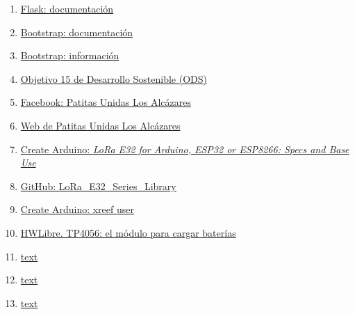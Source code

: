 \documentclass[12pt]{article}
\begin{document}
\begin{enumerate}
						
			\item 
			\label{bib: flask doc}
			\href{https://flask.palletsprojects.com/en/2.0.x/}{Flask: documentación}
			
			
			\item 
			\label{bib: bootstrap doc}
			\href{https://getbootstrap.com/docs/5.0/getting-started/introduction/}{Bootstrap: documentación}
			
			
			\item 
			\label{bib: bootstrap info}
			\href{https://rockcontent.com/es/blog/bootstrap/}{Bootstrap: información}
			
			
			\item 
			\label{bib: ods}
			\href{https://www.un.org/sustainabledevelopment/es/biodiversity/}{Objetivo 15 de Desarrollo Sostenible (ODS)}

			\item 
			\label{bib: fb patitas}
			\href{https://www.facebook.com/patitasunidaslosalcazares/}{Facebook: Patitas Unidas Los Alcázares}

			\item 
			\label{bib: web patitas}
			\href{https://patitasunidas.org/}{Web de Patitas Unidas Los Alcázares}

			\item 
			\label{bib: xreef proyect}
			\href{https://create.arduino.cc/projecthub/xreef/lora-e32-for-arduino-esp32-or-esp8266-specs-and-base-use-804d25}{Create Arduino: \textit{LoRa E32 for Arduino, ESP32 or ESP8266: Specs and Base Use}}		

			\item 
			\label{bib: xreef library}
			\href{https://github.com/xreef/LoRa_E32_Series_Library}{GitHub: LoRa\_E32\_Series\_Library}	

			\item 
			\label{bib: xreef user}
			\href{https://create.arduino.cc/projecthub/xreef}{Create Arduino: xreef user}	

			\item 
			\label{bib: hwlibre TP4056}
			\href{https://www.hwlibre.com/tp4056/}{HWLibre. TP4056: el módulo para cargar baterías}	

			\item 
			\label{bib: link12}
			\href{URL}{text}	

			\item 
			\label{bib: link12}
			\href{URL}{text}	

			\item 
			\label{bib: link12}
			\href{URL}{text}	


\end{enumerate}
\end{document}
